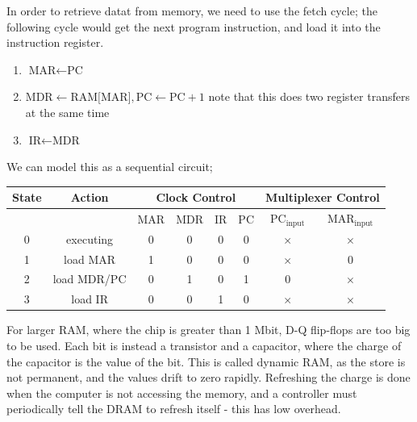 \documentclass[a4paper, 12pt]{article}
\begin{document}
            In order to retrieve datat from memory, we need to use the fetch cycle; the following cycle would get the next program instruction, and load it into the instruction register.
            \begin{enumerate}[1.]
                \itemsep0em
                \item $\text{MAR} \leftarrow \text{PC}$
                \item $\text{MDR} \leftarrow \text{RAM[MAR]}, \text{PC} \leftarrow \text{PC} + 1$
                    \subitem note that this does two register transfers at the same time
                \item $\text{IR} \leftarrow \text{MDR}$
            \end{enumerate}
            We can model this as a sequential circuit;
            \begin{center}
                \begin{tabular}{c|c||c|c|c|c||c|c}
                    State & Action & \multicolumn{4}{c||}{Clock Control} & \multicolumn{2}{c}{Multiplexer Control} \\
                    \hline
                    \multicolumn{2}{c||}{\ } & MAR & MDR & IR & PC & $\text{PC}_\text{input}$ & $\text{MAR}_\text{input}$ \\
                    \hline
                    0 & executing & 0 & 0 & 0 & 0 & $\times$ & $\times$ \\
                    1 & load MAR & 1 & 0 & 0 & 0 & $\times$ & 0 \\
                    2 & load MDR/PC & 0 & 1 & 0 & 1 & 0 & $\times$ \\
                    3 & load IR & 0 & 0 & 1 & 0 & $\times$ & $\times$ \\
                \end{tabular}
                \bigskip

            \end{center}
            For larger RAM, where the chip is greater than 1 Mbit, D-Q flip-flops are too big to be used. Each bit is instead a transistor and a capacitor, where the charge of the capacitor is the value of the bit. This is called dynamic RAM, as the store is not permanent, and the values drift to zero rapidly. Refreshing the charge is done when the computer is not accessing the memory, and a controller must periodically tell the DRAM to refresh itself - this has low overhead.
\end{document}
